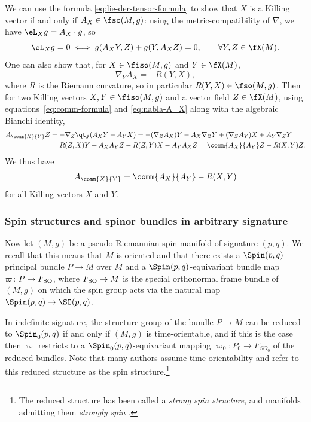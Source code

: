 We can use the formula \eqref{eq:lie-der-tensor-formula} to show that $X$ is a Killing vector if and only if $A_X\in\fso(M,g)$: using the metric-compatibility of $\nabla$, we have $\eL_X g = A_X\cdot g$, so
\begin{equation}\label{eq:killing-condition}
	\eL_X g = 0 \iff g(A_X Y, Z) + g(Y,A_X Z) = 0,\qquad\forall Y,Z\in\fX(M).
\end{equation}
One can also show \cite[Lemma~2.2]{Kostant1955} that, for $X\in\fiso(M,g)$ and $Y\in\fX(M)$,
\begin{equation}\label{eq:nabla-A_X}
	\nabla_Y A_X = -R(Y,X),
\end{equation}
where $R$ is the Riemann curvature, so in particular $R(Y,X)\in\fso(M,g)$. Then for two Killing vectors $X,Y\in\fiso(M,g)$ and a vector field $Z\in\fX(M)$, using equations~\eqref{eq:comm-formula} and \eqref{eq:nabla-A_X} along with the algebraic Bianchi identity,
\begin{align*}
	A_{\comm{X}{Y}}Z
		&= -\nabla_Z\qty(A_X Y - A_Y X)= -(\nabla_ZA_X)Y - A_X\nabla_ZY + (\nabla_ZA_Y)X + A_Y\nabla_ZY\\
		&= R(Z,X)Y + A_XA_YZ - R(Z,Y)X- A_YA_XZ= \comm{A_X}{A_Y}Z - R(X,Y)Z.
\end{align*}
We thus have
\begin{equation}\label{eq:A-comm}
	A_{\comm{X}{Y}} = \comm{A_X}{A_Y} - R(X,Y)
\end{equation}
for all Killing vectors $X$ and $Y$.

\subsubsection{Spin structures and spinor bundles in arbitrary signature}
\label{sec:spin-structures}

Now let $(M,g)$ be a pseudo-Riemannian spin manifold of signature $(p,q)$. We recall that this means that $M$ is oriented and that there exists a $\Spin(p,q)$-principal bundle $P\to M$ over $M$ and a $\Spin(p,q)$-equivariant bundle map $\varpi\colon P\to F_{\rm SO}$, where $F_{\rm SO}\to M$ is the special orthonormal frame bundle of $(M,g)$ on which the spin group acts via the natural map $\Spin(p,q)\to\SO(p,q)$.

In indefinite signature, the structure group of the bundle $P\to M$ can be reduced to $\Spin_0(p,q)$ if and only if $(M,g)$ is time-orientable, and if this is the case then $\varpi$ restricts to a $\Spin_0(p,q)$-equivariant mapping $\varpi_0\colon P_0\to F_{SO_0}$ of the reduced bundles. Note that many authors assume time-orientability and refer to this reduced structure as the spin structure.\footnote{The reduced structure has been called a \emph{strong spin structure}, and manifolds admitting them \emph{strongly spin} \cite{Cortes2021,Shahbazi2024_2,Shahbazi2024_1}.}
	
